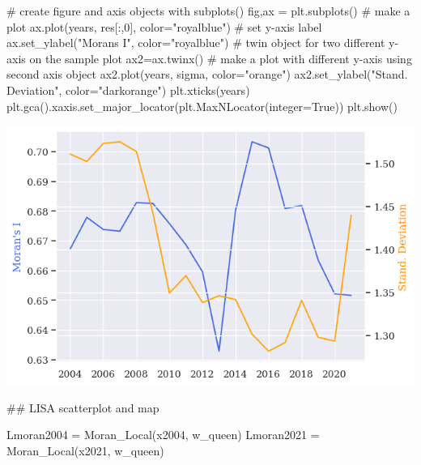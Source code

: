 \documentclass[
  letterpaper,
  DIV=11,
  numbers=noendperiod]{scrreprt}
\newenvironment{Shaded}{\begin{snugshade}}{\end{snugshade}}
\newcommand{\CommentTok}[1]{\textcolor[rgb]{0.37,0.37,0.37}{#1}}
\newcommand{\DecValTok}[1]{\textcolor[rgb]{0.68,0.00,0.00}{#1}}
\newcommand{\NormalTok}[1]{\textcolor[rgb]{0.00,0.23,0.31}{#1}}
\newcommand{\OperatorTok}[1]{\textcolor[rgb]{0.37,0.37,0.37}{#1}}
\newcommand{\StringTok}[1]{\textcolor[rgb]{0.13,0.47,0.30}{#1}}
\newcommand{\VariableTok}[1]{\textcolor[rgb]{0.07,0.07,0.07}{#1}}
\begin{document}
\begin{Shaded}
\begin{Highlighting}[]
\CommentTok{\# create figure and axis objects with subplots()}
\NormalTok{fig,ax }\OperatorTok{=}\NormalTok{ plt.subplots()}
\CommentTok{\# make a plot}
\NormalTok{ax.plot(years, res[:,}\DecValTok{0}\NormalTok{], color}\OperatorTok{=}\StringTok{"royalblue"}\NormalTok{)}
\CommentTok{\# set y{-}axis label}
\NormalTok{ax.set\_ylabel(}\StringTok{"Moran\textquotesingle{}s I"}\NormalTok{, color}\OperatorTok{=}\StringTok{"royalblue"}\NormalTok{)}
\CommentTok{\# twin object for two different y{-}axis on the sample plot}
\NormalTok{ax2}\OperatorTok{=}\NormalTok{ax.twinx()}
\CommentTok{\# make a plot with different y{-}axis using second axis object}
\NormalTok{ax2.plot(years, sigma, color}\OperatorTok{=}\StringTok{"orange"}\NormalTok{)}
\NormalTok{ax2.set\_ylabel(}\StringTok{"Stand. Deviation"}\NormalTok{, color}\OperatorTok{=}\StringTok{"darkorange"}\NormalTok{)}
\NormalTok{plt.xticks(years)}
\NormalTok{plt.gca().xaxis.set\_major\_locator(plt.MaxNLocator(integer}\OperatorTok{=}\VariableTok{True}\NormalTok{))}
\NormalTok{plt.show()}
\end{Highlighting}
\end{Shaded}

\includegraphics{labs/final_informal_files/figure-pdf/cell-27-output-1.png}

\begin{Shaded}
\begin{Highlighting}[]
\CommentTok{\#\# LISA scatterplot and map}
\end{Highlighting}
\end{Shaded}

\begin{Shaded}
\begin{Highlighting}[]
\NormalTok{Lmoran2004 }\OperatorTok{=}\NormalTok{ Moran\_Local(x2004, w\_queen)}
\NormalTok{Lmoran2021 }\OperatorTok{=}\NormalTok{ Moran\_Local(x2021, w\_queen)}
\end{Highlighting}
\end{Shaded}
\end{document}
